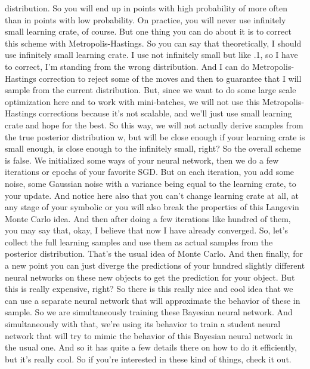 \documentclass[11pt, oneside, reqno]{amsart}
\numberwithin{equation}{section}
\theoremstyle{plain}%
\theoremstyle{definition}
\theoremstyle{remark}
\begin{document}
distribution. So you will end up in points with high probability of more often than in points with low probability. On practice, you will never use infinitely small learning crate, of course. But one thing you can do about it is to correct this scheme with Metropolis-Hastings. So you can say that theoretically, I should use infinitely small learning crate. I use not infinitely small but like .1, so I have to correct, I'm standing from the wrong distribution. And I can do Metropolis-Hastings correction to reject some of the moves and then to guarantee that I will sample from the current distribution. But, since we want to do some large scale optimization here and to work with mini-batches, we will not use this Metropolis- Hastings corrections because it's not scalable, and we'll just use small learning crate and hope for the best. So this way, we will not actually derive samples from the true posterior distribution w, but will be close enough if your learning crate is small enough, is close enough to the infinitely small, right? So the overall scheme is false. We initialized some ways of your neural network, then we do a few iterations or epochs of your favorite SGD. But on each iteration, you add some noise, some Gaussian noise with a variance being equal to the learning crate, to your update. And notice here also that you can't change learning crate at all, at any stage of your symbolic or you will also break the properties of this Langevin Monte Carlo idea. And then after doing a few iterations like hundred of them, you may say that, okay, I believe that now I have already converged. So, let's collect the full learning samples and use them as actual samples from the posterior distribution. That's the usual idea of Monte Carlo. And then finally, for a new point you can just diverge the predictions of your hundred slightly different neural networks on these new objects to get the prediction for your object. But this is really expensive, right? So there is this really nice and cool idea that we can use a separate neural network that will approximate the behavior of these in sample. So we are simultaneously training these Bayesian neural network. And simultaneously with that, we're using its behavior to train a student neural network that will try to mimic the behavior of this Bayesian neural network in the usual one. And so it has quite a few details there on how to do it efficiently, but it's really cool. So if you're interested in these kind of things, check it out.
\end{document}
